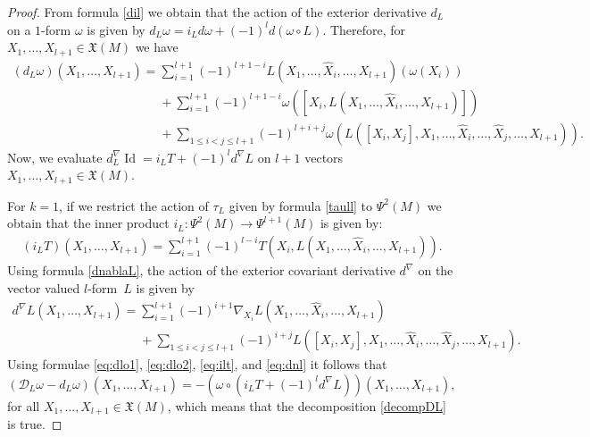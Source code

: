\documentclass[11pt]{article}
\numberwithin{equation}{section}
\begin{document}
\begin{proof}
From formula \eqref{dil} we obtain that the action of the exterior
derivative $d_L$ on a $1$-form $\omega$ is given by
$d_L\omega=i_Ld\omega+ (-1)^ld(\omega\circ L)$.
Therefore, for $X_1, \dots , X_{l+1} \in {\mathfrak X}(M)$ we have{\samepage
\begin{gather}
\nonumber (d_L\omega)(X_1,\dots ,X_{l+1})   =   \sum_{i=1}^{l+1}(-1)^{l+1-i}
L(X_1,\dots , \hat{X}_i,\dots , X_{l+1})(\omega(X_i))  \\
\label{eq:dlo2}
\phantom{(d_L\omega)(X_1,\dots ,X_{l+1})   =}{}
+\sum_{i=1}^{l+1}(-1)^{l+1-i} \omega([X_i, L(X_1,\dots ,
\hat{X}_i,\dots , X_{l+1})])  \\
\nonumber   \phantom{(d_L\omega)(X_1,\dots ,X_{l+1})   =}{}
 +\sum_{1\leq i<j\leq l+1}
(-1)^{l+i+j}\omega(L([X_i,X_j], X_1,\dots , \hat{X}_i,\dots ,
\hat{X}_j,\dots , X_{l+1})).
\end{gather}
Now, we evaluate $d^{\nabla}_L\operatorname{Id}=i_LT + (-1)^l
d^{\nabla}L$ on $l+1$ vectors $X_1, \dots , X_{l+1} \in {\mathfrak
X}(M)$.}

For $k=1$, if we restrict the action of $\tau_L$ given by formula
\eqref{taull} to $\Psi^2(M)$ we obtain that the inner product $i_L: \Psi^2(M) \to
\Psi^{l+1}(M)$ is given by:
\begin{gather}
\left(i_LT\right)(X_1,\dots ,
X_{l+1})=\sum_{i=1}^{l+1}(-1)^{l-i}T(X_i, L(X_1,\dots , \hat{X}_i,
\dots , X_{l+1})). \label{eq:ilt}
\end{gather} Using formula \eqref{dnablaL}, the action of the exterior covariant derivative
$d^{\nabla}$ on the vector valued
$l$-form~$L$ is given by
\begin{gather}
\nonumber   d^{\nabla}L(X_1,\dots , X_{l+1}) = \sum_{i=1}^{l+1}
(-1)^{i+1}\nabla_{X_i}L(X_1,\dots , \hat{X}_i, \dots , X_{l+1})  \\
\phantom{d^{\nabla}L(X_1,\dots , X_{l+1}) =}{}
 + \sum_{1\leq i<j\leq l+1} (-1)^{i+j}L([X_i, X_j], X_1,\dots ,
\hat{X}_i,\dots , \hat{X}_j,\dots , X_{l+1}). \label{eq:dnl}
\end{gather}
Using formulae \eqref{eq:dlo1}, \eqref{eq:dlo2}, \eqref{eq:ilt}, and \eqref{eq:dnl} it follows that
\[
\left({\mathcal D}_L \omega-d_L\omega\right)(X_1,\dots ,X_{l+1}) =
-\left(\omega\circ (i_LT+(-1)^ld^{\nabla}L)\right)(X_1,\dots ,X_{l+1}),
\]
for all $X_1,\dots , X_{l+1}\in  {\mathfrak X}(M)$, which means that the decomposition \eqref{decompDL} is true.
\end{proof}
\end{document}
